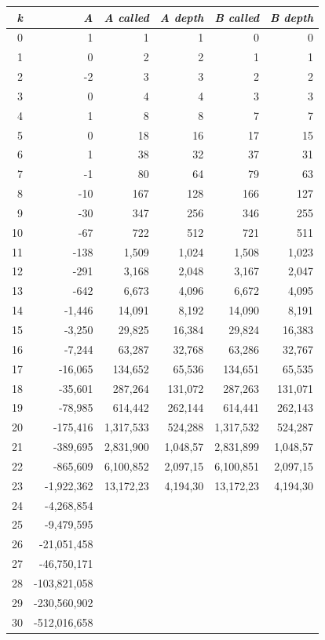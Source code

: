 \begin{table}[H]
  \centering
  \begin{tabular}{rrrrrr}
\emph{k} & \emph{A} & \emph{A called} & \emph{A depth} & \emph{B called} & \emph{B depth} \\               
\hline{}
0 & 1 & 1 & 1 & 0 & 0 \\      
1 & 0 & 2 & 2 & 1 & 1 \\      
2 & -2 & 3 & 3 & 2 & 2 \\       
3 & 0 & 4 & 4 & 3 & 3 \\       
4 & 1 & 8 & 8 & 7 & 7 \\       
5 & 0 & 18 & 16 & 17 & 15 \\     
6 & 1 & 38 & 32 & 37 & 31 \\     
7 & -1 & 80 & 64 & 79 & 63 \\     
8 & -10 & 167 & 128 & 166 & 127 \\    
9 & -30 & 347 & 256 & 346 & 255 \\    
10 & -67 & 722 & 512 & 721 & 511 \\    
11 & -138 & 1,509 & 1,024 & 1,508 & 1,023 \\  
12 & -291 & 3,168 & 2,048 & 3,167 & 2,047 \\  
13 & -642 & 6,673 & 4,096 & 6,672 & 4,095 \\  
14 & -1,446 & 14,091 & 8,192 & 14,090 & 8,191 \\  
15 & -3,250 & 29,825 & 16,384 & 29,824 & 16,383 \\ 
16 & -7,244 & 63,287 & 32,768 & 63,286 & 32,767 \\ 
17 & -16,065 & 134,652 & 65,536 & 134,651 & 65,535 \\ 
18 & -35,601 & 287,264 & 131,072 & 287,263 & 131,071 \\
19 & -78,985 & 614,442 & 262,144 & 614,441 & 262,143 \\
20 & -175,416 & 1,317,533 & 524,288 & 1,317,532 & 524,287 \\
21 & -389,695 & 2,831,900 & 1,048,57 & 2,831,899 & 1,048,57 \\
22 & -865,609 & 6,100,852 & 2,097,15 & 6,100,851 & 2,097,15 \\ 
23 & -1,922,362 & 13,172,23 & 4,194,30 & 13,172,23 & 4,194,30 \\
24 & -4,268,854 & ~ & ~ & ~ & ~ \\      
25 & -9,479,595 & ~ & ~ & ~ & ~ \\      
26 & -21,051,458 & ~ & ~ & ~ & ~ \\      
27 & -46,750,171 & ~ & ~ & ~ & ~ \\      
28 & -103,821,058 & ~ & ~ & ~ & ~ \\      
29 & -230,560,902 & ~ & ~ & ~ & ~ \\      
30 & -512,016,658 & ~ & ~ & ~ & ~ \\      
  \end{tabular}
\end{table}


